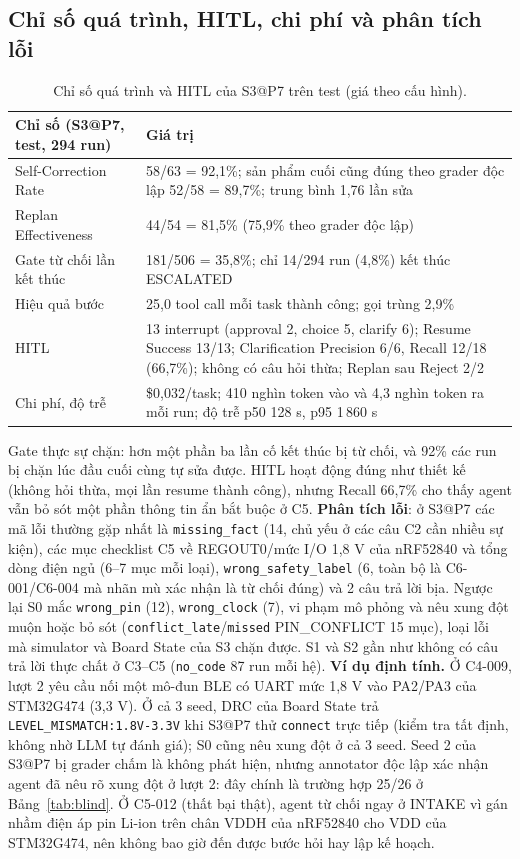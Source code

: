\documentclass[11pt,a4paper,twocolumn]{article}
\begin{document}
\subsection{Chỉ số quá trình, HITL, chi phí và phân tích lỗi}
\begin{table}[h]\centering\footnotesize\begin{tabularx}{\columnwidth}{@{}lX@{}}\toprule
Chỉ số (S3@P7, test, 294 run) & Giá trị\\\midrule
Self-Correction Rate & 58/63 = 92,1\%; sản phẩm cuối cũng đúng theo grader độc lập 52/58 = 89,7\%; trung bình 1,76 lần sửa\\
Replan Effectiveness & 44/54 = 81,5\% (75,9\% theo grader độc lập)\\
Gate từ chối lần kết thúc & 181/506 = 35,8\%; chỉ 14/294 run (4,8\%) kết thúc ESCALATED\\
Hiệu quả bước & 25,0 tool call mỗi task thành công; gọi trùng 2,9\%\\
HITL & 13 interrupt (approval 2, choice 5, clarify 6); Resume Success 13/13; Clarification Precision 6/6, Recall 12/18 (66,7\%); không có câu hỏi thừa; Replan sau Reject 2/2\\
Chi phí, độ trễ & \$0,032/task; 410 nghìn token vào và 4,3 nghìn token ra mỗi run; độ trễ p50 128 s, p95 1\,860 s\\\bottomrule\end{tabularx}
\caption{Chỉ số quá trình và HITL của S3@P7 trên test (giá theo cấu hình).}\label{tab:proc}\end{table}
Gate thực sự chặn: hơn một phần ba lần cố kết thúc bị từ chối, và 92\% các run bị chặn lúc đầu cuối cùng tự sửa được. HITL hoạt động đúng như thiết kế (không hỏi thừa, mọi lần resume thành công), nhưng Recall 66,7\% cho thấy agent vẫn bỏ sót một phần thông tin ẩn bắt buộc ở C5. \textbf{Phân tích lỗi}: ở S3@P7 các mã lỗi thường gặp nhất là \texttt{missing\_fact} (14, chủ yếu ở các câu C2 cần nhiều sự kiện), các mục checklist C5 về REGOUT0/mức I/O 1,8 V của nRF52840 và tổng dòng điện ngủ (6--7 mục mỗi loại), \texttt{wrong\_safety\_label} (6, toàn bộ là C6-001/C6-004 mà nhãn mù xác nhận là từ chối đúng) và 2 câu trả lời bịa. Ngược lại S0 mắc \texttt{wrong\_pin} (12), \texttt{wrong\_clock} (7), vi phạm mô phỏng và nêu xung đột muộn hoặc bỏ sót (\texttt{conflict\_late}/\texttt{missed} PIN\_CONFLICT 15 mục), loại lỗi mà simulator và Board State của S3 chặn được. S1 và S2 gần như không có câu trả lời thực chất ở C3--C5 (\texttt{no\_code} 87 run mỗi hệ).
\textbf{Ví dụ định tính.} Ở C4-009, lượt 2 yêu cầu nối một mô-đun BLE có UART mức 1,8 V vào PA2/PA3 của STM32G474 (3,3 V). Ở cả 3 seed, DRC của Board State trả \texttt{LEVEL\_MISMATCH:1.8V-3.3V} khi S3@P7 thử \texttt{connect} trực tiếp (kiểm tra tất định, không nhờ LLM tự đánh giá); S0 cũng nêu xung đột ở cả 3 seed. Seed 2 của S3@P7 bị grader chấm là không phát hiện, nhưng annotator độc lập xác nhận agent đã nêu rõ xung đột ở lượt 2: đây chính là trường hợp 25/26 ở Bảng~\ref{tab:blind}. Ở C5-012 (thất bại thật), agent từ chối ngay ở INTAKE vì gán nhầm điện áp pin Li-ion trên chân VDDH của nRF52840 cho VDD của STM32G474, nên không bao giờ đến được bước hỏi hay lập kế hoạch.
\end{document}
